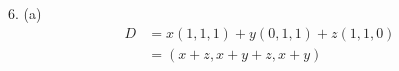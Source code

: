 \documentclass[a4paper,12pt]{article}
\begin{document}
6. (a)\begin{align*}
D &= x(1, 1, 1) + y(0, 1, 1) + z(1, 1, 0) \\
  &= (x + z, x + y + z, x + y)
\end{align*}
\end{document}

